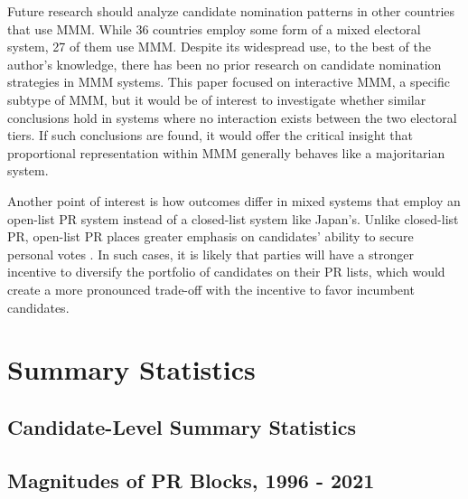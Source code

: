 \documentclass[a4paper, 11pt]{article}
\begin{document}
Future research should analyze candidate nomination patterns in other countries that use MMM. While 36 countries employ some form of a mixed electoral system, 27 of them use MMM. Despite its widespread use, to the best of the author’s knowledge, there has been no prior research on candidate nomination strategies in MMM systems. This paper focused on interactive MMM, a specific subtype of MMM, but it would be of interest to investigate whether similar conclusions hold in systems where no interaction exists between the two electoral tiers. If such conclusions are found, it would offer the critical insight that proportional representation within MMM generally behaves like a majoritarian system.

Another point of interest is how outcomes differ in mixed systems that employ an open-list PR system instead of a closed-list system like Japan’s. Unlike closed-list PR, open-list PR places greater emphasis on candidates’ ability to secure personal votes \citep{nemotoLocalismCoordinationThree2013, shugartLookingLocalsVoter2005}. In such cases, it is likely that parties will have a stronger incentive to diversify the portfolio of candidates on their PR lists, which would create a more pronounced trade-off with the incentive to favor incumbent candidates.

\newpage




\newpage

\appendix

\setcounter{table}{0}
\setcounter{figure}{0}
\renewcommand{\thetable}{A\arabic{table}}
\renewcommand{\thefigure}{A\arabic{figure}}

\section{Summary Statistics}

\subsection{Candidate-Level Summary Statistics}



\newpage

\subsection{Magnitudes of PR Blocks, 1996 - 2021}
\end{document}
